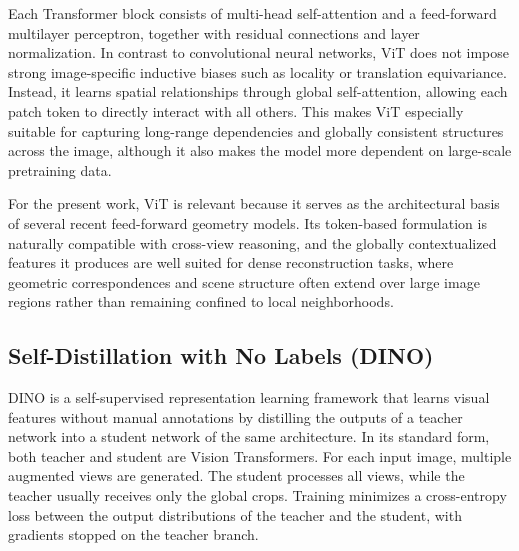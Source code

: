 Each Transformer block consists of multi-head self-attention and a feed-forward multilayer perceptron, together with residual connections and layer normalization.\cite{dosovitskiy2021vit} In contrast to convolutional neural networks, ViT does not impose strong image-specific inductive biases such as locality or translation equivariance. Instead, it learns spatial relationships through global self-attention, allowing each patch token to directly interact with all others. This makes ViT especially suitable for capturing long-range dependencies and globally consistent structures across the image, although it also makes the model more dependent on large-scale pretraining data.

For the present work, ViT is relevant because it serves as the architectural basis of several recent feed-forward geometry models. Its token-based formulation is naturally compatible with cross-view reasoning, and the globally contextualized features it produces are well suited for dense reconstruction tasks, where geometric correspondences and scene structure often extend over large image regions rather than remaining confined to local neighborhoods.

\subsection{Self-Distillation with No Labels (DINO)}
DINO is a self-supervised representation learning framework that learns visual features without manual annotations by distilling the outputs of a teacher network into a student network of the same architecture.\cite{caron2021dino} In its standard form, both teacher and student are Vision Transformers. For each input image, multiple augmented views are generated. The student processes all views, while the teacher usually receives only the global crops. Training minimizes a cross-entropy loss between the output distributions of the teacher and the student, with gradients stopped on the teacher branch.

